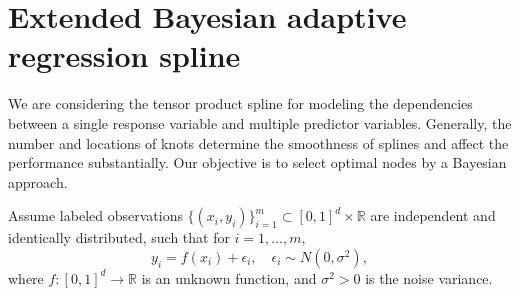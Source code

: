 \section{Extended Bayesian adaptive regression spline}

We are considering the tensor product spline for modeling the dependencies between a single response variable and multiple predictor variables. Generally, the number and locations of knots determine the smoothness of splines and affect the performance substantially. Our objective is to select optimal nodes by a Bayesian approach.

Assume labeled observations $\{(x_i,y_i)\}_{i=1}^m\subset [0,1]^d\times \mathbb{R}$ are independent and identically distributed, such that for $i=1,\ldots,m$,
\begin{equation}
\label{eq:normal_regression}
    y_i = f(x_i) + \epsilon_i,\quad \epsilon_i\sim N(0,\sigma^2),
\end{equation}
where $f:[0,1]^d\rightarrow \mathbb{R}$ is an unknown function, and $\sigma^2>0$ is the noise variance.



